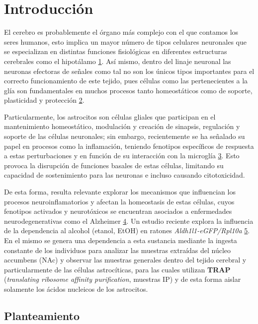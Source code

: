 \documentclass[
  9pt,
]{article}
\author{}
\date{}
\begin{document}



\newpage

\section{Introducción}\label{introducciuxf3n}

El cerebro es probablemente el órgano más complejo con el que contamos
los seres humanos, esto implica un mayor número de tipos celulares
neuronales que se especializan en distintas funciones fisiológicas en
diferentes estructuras cerebrales como el hipotálamo
\hyperref[section]{1}. Así mismo, dentro del linaje neuronal las
neuronas efectoras de señales como tal no son los únicos tipos
importantes para el correcto funcionamiento de este tejido, pues células
como las pertenecientes a la glía son fundamentales en muchos procesos
tanto homeostáticos como de soporte, plasticidad y protección
\hyperref[section-1]{2}.

Particularmente, los astrocitos son células gliales que participan en el
mantenimiento homeostático, modulación y creación de sinapsis,
regulación y soporte de las células neuronales; sin embargo,
recientemente se ha señalado su papel en procesos como la inflamación,
teniendo fenotipos específicos de respuesta a estas perturbaciones y en
función de su interacción con la microglía \hyperref[section-2]{3}. Esto
provoca la disrupción de funciones basales de estas células, limitando
su capacidad de sostenimiento para las neuronas e incluso causando
citotoxicidad.

De esta forma, resulta relevante explorar los mecanismos que influencian
los procesos neuroinflamatorios y afectan la homeostasis de estas
células, cuyos fenotipos activados y neurotóxicos se encuentran
asociados a enfermedades neurodegenerativas como el Alzheimer
\hyperref[section-3]{4}. Un estudio reciente explora la influencia de la
dependencia al alcohol (etanol, EtOH) en ratones
\emph{Aldh1l1-eGFP/Rpl10a} \hyperref[section-4]{5}. En el mismo se
genera una dependencia a esta sustancia mediante la ingesta constante de
los individuos para analizar las muestras extraídas del núcleo accumbens
(NAc) y observar las muestras generales dentro del tejido cerebral y
particularmente de las células astrocíticas, para las cuales utilizan
\textbf{TRAP} (\emph{translating ribosome affinity purification},
muestras IP) y de esta forma aislar solamente los ácidos nucleicos de
los astrocitos.

\subsection{Planteamiento}\label{planteamiento}
\end{document}
